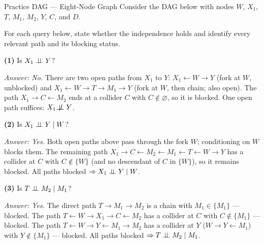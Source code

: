 \documentclass[master.tex]{subfiles}
\begin{document}
\begin{example}{Practice DAG --- Eight-Node Graph}
\label{w2:ex:practicedag}
Consider the DAG below with nodes $W$, $X_1$, $T$, $M_1$, $M_2$, $Y$,
$C$, and $D$.

\begin{center}
\end{center}

For each query below, state whether the independence holds and identify
every relevant path and its blocking status.

\medskip
\noindent\textbf{(1)} Is $X_1 \perp\!\!\!\perp Y$?

\noindent\emph{Answer: No.}
There are two open paths from $X_1$ to $Y$:
$X_1 \leftarrow W \to Y$ (fork at $W$, unblocked)
and $X_1 \leftarrow W \to T \to M_1 \to Y$ (fork at $W$, then chain; also open).
The path $X_1 \to C \leftarrow M_2$ ends at a collider $C$ with $C \notin \varnothing$,
so it is blocked. One open path suffices: $X_1 \not\!\perp\!\!\!\perp Y$.

\medskip
\noindent\textbf{(2)} Is $X_1 \perp\!\!\!\perp Y \mid W$?

\noindent\emph{Answer: Yes.}
Both open paths above pass through the fork $W$; conditioning on $W$ blocks them.
The remaining path $X_1 \to C \leftarrow M_2 \leftarrow M_1 \leftarrow T \leftarrow W \to Y$
has a collider at $C$ with $C \notin \{W\}$ (and no descendant of $C$ in $\{W\}$),
so it remains blocked.
All paths blocked $\Rightarrow X_1 \perp\!\!\!\perp Y \mid W$.

\medskip
\noindent\textbf{(3)} Is $T \perp\!\!\!\perp M_2 \mid M_1$?

\noindent\emph{Answer: Yes.}
The direct path $T \to M_1 \to M_2$ is a chain with $M_1 \in \{M_1\}$ --- blocked.
The path $T \leftarrow W \to X_1 \to C \leftarrow M_2$ has a collider at $C$
with $C \notin \{M_1\}$ --- blocked.
The path $T \leftarrow W \to Y \leftarrow M_1 \to M_2$ has a collider at $Y$
($W \to Y \leftarrow M_1$) with $Y \notin \{M_1\}$ --- blocked.
All paths blocked $\Rightarrow T \perp\!\!\!\perp M_2 \mid M_1$.


\end{example}
\end{document}

